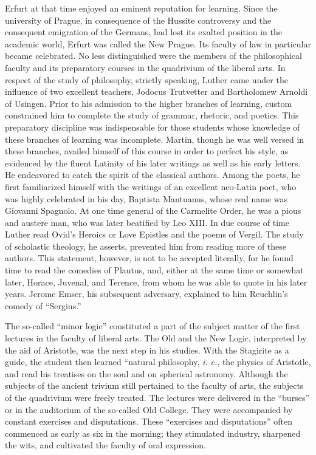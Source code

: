 Erfurt at that time enjoyed an eminent reputation for learning.
Since the university of Prague, in consequence of the Hussite controversy and
the consequent emigration of the Germans, had lost its
exalted position in the academic world, Erfurt was called the New
Prague. Its faculty of law in particular became celebrated. No less
distinguished were the members of the philosophical faculty and its
preparatory courses in the quadrivium of the liberal arts. In respect of
the study of philosophy, strictly speaking, Luther came under the influence of two excellent teachers, Jodocus Trutvetter and Bartholomew Arnoldi of Usingen. Prior to his admission to the higher
branches of learning, custom constrained him to complete the study
of grammar, rhetoric, and poetics. This preparatory discipline was
indispensable for those students whose knowledge of these branches of
learning was incomplete. Martin, though he was well versed in these
branches, availed himself of this course in order to perfect his style,
as evidenced by the fluent Latinity of his later writings as well as his
early letters. He endeavored to catch the spirit of the classical authors.
Among the poets, he first familiarized himself with the writings of
an excellent neo-Latin poet, who was highly celebrated in his day,
Baptista Mantuanus, whose real name was Giovanni Spagnolo. At one
time general of the Carmelite Order, he was a pious and austere man,
who was later beatified by Leo XIII. In due course of time Luther
read Ovid’s Heroics or Love Epistles and the poems of Vergil. The
study of scholastic theology, he asserts, prevented him from reading
more of these authors. This statement, however, is not to be accepted
literally, for he found time to read the comedies of Plautus, and,
either at the same time or somewhat later, Horace, Juvenal, and Terence, from
whom he was able to quote in his later years. Jerome Emser, his subsequent
adversary, explained to him Reuchlin’s comedy of “Sergius.”

The so-called “minor logic” constituted a part of the subject matter of the
first lectures in the faculty of liberal arts. The Old
and the New Logic, interpreted by the aid of Aristotle, was the next
step in his studies. With the Stagirite as a guide, the student then
learned “natural philosophy, \textit{i. e.}, the physics of Aristotle, and read his
treatises on the soul and on spherical astronomy. Although the subjects of the
ancient trivium still pertained to the faculty of arts, the
subjects of the quadrivium were freely treated. The lectures were delivered in
the “burses” or in the auditorium of the so-called Old College. They were
accompanied by constant exercises and disputations.
These “exercises and disputations” often commenced as early as six
in the morning; they stimulated industry, sharpened the wits, and
cultivated the faculty of oral expression.

